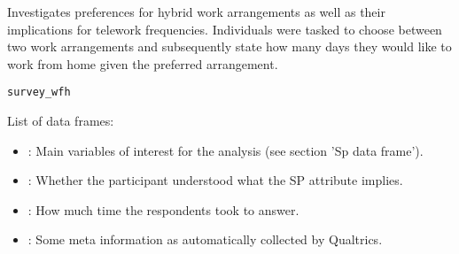 %
\begin{SeeAlso}
\end{SeeAlso}


%
\begin{Description}
Investigates preferences for hybrid work arrangements as well as their
implications for telework frequencies. Individuals were tasked to choose
between two work arrangements and subsequently state how many days they would
like to work from home given the preferred arrangement.
\end{Description}
%
\begin{Usage}
\begin{verbatim}
survey_wfh
\end{verbatim}
\end{Usage}
%
\begin{Format}
List of data frames:
\begin{itemize}

\item{} : Main variables of interest for the analysis (see section 'Sp data frame').
\item{} : Whether the participant understood what the SP attribute implies.
\item{} : How much time the respondents took to answer.
\item{} : Some meta information as automatically collected by Qualtrics.

\end{itemize}

\end{Format}
%
